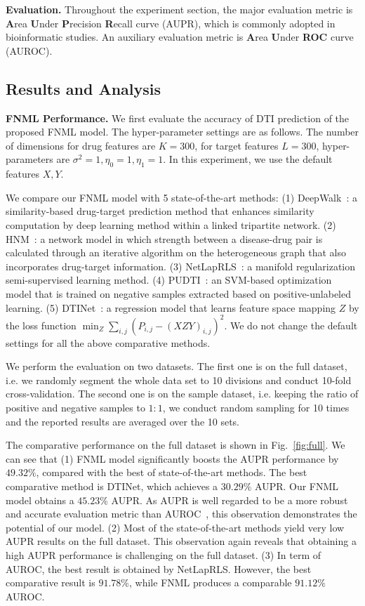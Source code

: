 \documentclass[conference]{IEEEtran}
\begin{document}

\textbf{Evaluation.} Throughout the experiment section, the major evaluation metric is \textbf{A}rea \textbf{U}nder \textbf{P}recision \textbf{R}ecall curve (AUPR), which is commonly adopted in bioinformatic studies. An auxiliary evaluation metric is \textbf{A}rea \textbf{U}nder \textbf{ROC} curve (AUROC).

\subsection{Results and Analysis}
\textbf{FNML Performance.} We first evaluate the accuracy of DTI prediction of the proposed FNML model. The hyper-parameter settings are as follows. The number of dimensions for drug features are $K=300$, for target features $L=300$, hyper-parameters are $\sigma^2=1,\eta_{0}=1,\eta_{1}=1$. In this experiment, we use the default features $X,Y$. 



We compare our FNML model with 5 state-of-the-art methods: (1) DeepWalk~\cite{Zong2017Deep}: a similarity-based drug-target prediction method that enhances similarity computation by deep learning method within a linked tripartite network. (2) HNM~\cite{Wang2014Drug}: a network model in which strength between a disease-drug pair is calculated through an iterative algorithm on the heterogeneous graph that also incorporates drug-target information. (3) NetLapRLS~\cite{Xia2010Semi}: a manifold regularization semi-supervised learning method. (4) PUDTI~\cite{Peng2017Screening}: an SVM-based optimization model that is trained on negative samples extracted based on positive-unlabeled learning. (5) DTINet~\cite{Luo2017Network}: a regression model that learns feature space mapping $Z$ by the loss function  $\min_{Z} \sum_{i,j}(P_{i,j}-(XZY)_{i,j})^2$. We do not change the default settings for all the above comparative methods.

We perform the evaluation on two datasets. The first one is on the full dataset, i.e. we randomly segment the whole data set to 10 divisions and conduct 10-fold cross-validation. The second one is on the sample dataset, i.e. keeping the ratio of positive and negative samples to $1:1$, we conduct random sampling for 10 times and the reported results are averaged over the 10 sets. 

The comparative performance on the full dataset is shown in Fig.~\ref{fig:full}. We can see that (1) FNML model significantly boosts the AUPR performance by $49.32\%$, compared with the best of state-of-the-art methods. The best comparative method is DTINet, which achieves a $30.29\%$ AUPR. Our FNML model obtains a $45.23\%$ AUPR. As AUPR is well regarded to be a more robust and accurate evaluation metric than AUROC~\cite{Luo2017Network}, this observation demonstrates the potential of our model. (2) Most of the state-of-the-art methods yield very low AUPR results on the full dataset. This observation again reveals that obtaining a high AUPR performance is challenging on the full dataset. (3) In term of AUROC, the best result is obtained by NetLapRLS. However, the best comparative result is $91.78\%$, while FNML produces a comparable $91.12\%$ AUROC. 
\end{document}
